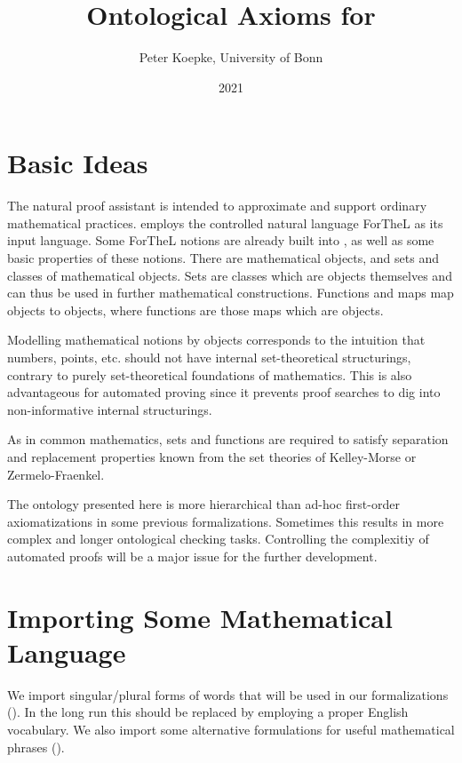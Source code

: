 \documentclass[11pt]{article}
\author{Peter Koepke, University of Bonn}
\title{Ontological Axioms for \Naproche}
\date{2021}
\begin{document}
\maketitle

\section{Basic Ideas}

The natural proof assistant \Naproche is intended to
approximate and support ordinary mathematical practices.
\Naproche employs the controlled natural language ForTheL
as its input language. Some ForTheL notions are already
built into \Naproche, as well as some basic properties of
these notions.
There are
mathematical objects, and sets and classes of mathematical
objects. Sets are classes which are objects themselves and
can thus be used in further mathematical constructions. Functions
and maps map objects to objects, where functions are those
maps which are objects.

Modelling mathematical notions by objects corresponds
to the intuition that numbers, points, etc. should
not have internal set-theoretical
structurings, contrary to purely set-theoretical
foundations of mathematics. This is also advantageous
for automated proving since it prevents proof searches to
dig into non-informative internal structurings.

As in common mathematics, sets and functions are required to
satisfy separation and replacement properties known from the
set theories of Kelley-Morse or Zermelo-Fraenkel.

The ontology presented here is more hierarchical than
ad-hoc first-order axiomatizations in some previous
\Naproche formalizations. Sometimes
this results in more complex and longer ontological checking tasks.
Controlling the complexitiy of automated proofs will be a major
issue for the further development.


\section{Importing Some Mathematical Language}

We import singular/plural forms of words that will be used in
our formalizations ().
In the long run this should be replaced by
employing a proper English vocabulary. We also
import some alternative formulations for
useful mathematical phrases ().
\end{document}
